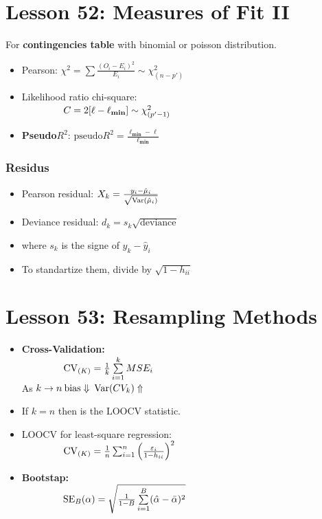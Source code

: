 \documentclass[10pt, french]{article}
\begin{document}
\begin{multicols*}{3}
\section*{Lesson 52: Measures of Fit II}
For \textbf{contingencies table}  with binomial or poisson distribution.
\begin{itemize}[align=left,leftmargin=*]
   \item Pearson: $\chi^2 = \sum \frac{(O_i - E_i)^2}{E_i} \sim \chi_{(n-p')}^2$
   \item Likelihood ratio chi-square: \\ $\hspace*{1.5cm} C = 2[\ell - \ell_{\mathbf{min}}] \sim \chi_{(p'-1)}^2$
   \item \textbf{Pseudo}$R^2$: $\mathrm{pseudo}R^2 = 
   \frac{\ell_{\mathbf{min}} -  \ell}{\ell_{\mathbf{min}}}$
\end{itemize}
\subsubsection*{Residus}
\begin{itemize}[align=left,leftmargin=*]
   \item Pearson residual: $X_k = \frac{y_i - \hat{\mu}_i}{\sqrt{\mathrm{Var} {\left( \hat{\mu}_i \right)}}}$
   \item Deviance residual: $d_k = s_k\sqrt{\mathrm{deviance}}$ 
   \item[] where $s_k$ is the signe of $y_k-\hat{y}_i$
   \item To standartize them, divide by $\sqrt{1-h_{ii}}$
\end{itemize}


\section*{Lesson 53: Resampling Methods}
\begin{itemize}[align=left,leftmargin=*]
   \item \textbf{Cross-Validation:}\\
  $\hspace*{1.5cm}  \mathrm{CV}_{(K)} = \frac{1}{k} \sum\limits_{i=1}^k MSE_i $\\ 
  As $k\to n\: \mathrm{bias} \Downarrow\: \mathrm{Var} {\left( CV_k \right)} \Uparrow$ 
  \item[] If $k=n$ then is the $\mathrm{LOOCV}$ statistic.
  \item $\mathrm{LOOCV}$ for least-square regression: \\
  $\hspace*{1.5cm} \mathrm{CV}_{(K)} = \frac{1}{n} \sum_{i=1}^n \left( \frac{\varepsilon_i}{1-h_{ii}}\right)^2$
  \item \textbf{Bootstap:} \\
  $\hspace*{1.5cm} \mathrm{SE}_B(\alpha) = \sqrt{\frac{1}{1-B} \sum\limits_{i=1}^B (\hat{\alpha} - \bar{\alpha})^2}$
\end{itemize}


\end{multicols*}
\end{document}
